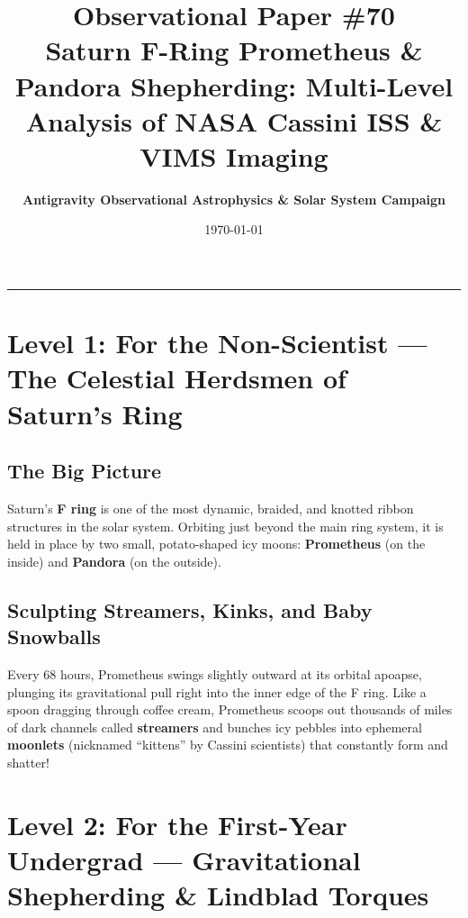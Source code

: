\documentclass[11pt,a4paper]{article}
\title{\Huge \textbf{Observational Paper \#70}\\ \Large Saturn F-Ring Prometheus \& Pandora Shepherding: Multi-Level Analysis of NASA Cassini ISS \& VIMS Imaging}
\author{\textbf{Antigravity Observational Astrophysics \& Solar System Campaign}}
\date{\today}
\begin{document}
\maketitle

\vspace{-1em}
\begin{center}
\rule{\textwidth}{1.5pt}
\end{center}

\section*{Level 1: For the Non-Scientist — The Celestial Herdsmen of Saturn's Ring}

\subsection*{The Big Picture}
Saturn's \textbf{F ring} is one of the most dynamic, braided, and knotted ribbon structures in the solar system. Orbiting just beyond the main ring system, it is held in place by two small, potato-shaped icy moons: \textbf{Prometheus} (on the inside) and \textbf{Pandora} (on the outside).

\subsection*{Sculpting Streamers, Kinks, and Baby Snowballs}
Every 68 hours, Prometheus swings slightly outward at its orbital apoapse, plunging its gravitational pull right into the inner edge of the F ring. Like a spoon dragging through coffee cream, Prometheus scoops out thousands of miles of dark channels called \textbf{streamers} and bunches icy pebbles into ephemeral \textbf{moonlets} (nicknamed ``kittens'' by Cassini scientists) that constantly form and shatter!

\newpage

\section*{Level 2: For the First-Year Undergrad — Gravitational Shepherding \& Lindblad Torques}
\end{document}
